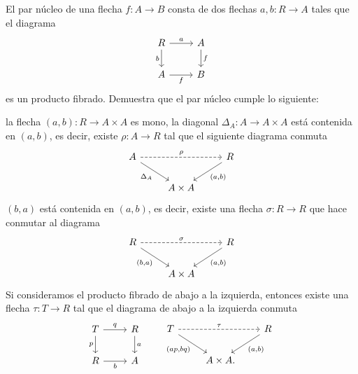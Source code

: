 \documentclass[article]{memoir}
\begin{document}
\begin{exercise}
  El par núcleo de una flecha \(f\colon A\to B\) consta de dos flechas \(a,b\colon R\to A\) tales que el diagrama
  \[
    \begin{tikzcd}[ampersand replacement=\&]
      R\ar{r}{a}\ar{d}[swap]{b} \& A\ar{d}{f}\\
      A\ar{r}[swap]{f} \& B
    \end{tikzcd}
  \]
  es un producto fibrado. Demuestra que el par núcleo cumple lo siguiente:
  \begin{tasks}
    \task la flecha \((a,b)\colon R\to A\times A\) es mono,
    \task la diagonal \(\Delta_A\colon A\to A\times A\) está contenida en \((a,b)\), es decir, existe \(\rho\colon A\to R\) tal que el siguiente diagrama conmuta
    \[
      \begin{tikzcd}[ampersand replacement=\&]
        A\ar[dashed]{rr}{\rho}\ar{rd}[swap]{\Delta_A} \&\& R\ar{ld}{{(a,b)}}\\
        \& A\times A
      \end{tikzcd}
    \]
    \task \((b,a)\) está contenida en \((a,b)\), es decir, existe una flecha \(\sigma\colon R\to R\) que hace conmutar al diagrama
    \[
      \begin{tikzcd}[ampersand replacement=\&]
        R\ar[dashed]{rr}{\sigma}\ar{rd}[swap]{{(b,a)}} \&\& R\ar{ld}{{(a,b)}}\\
        \& A\times A
      \end{tikzcd}
    \]
    \task Si consideramos el producto fibrado de abajo a la izquierda, entonces existe una flecha \(\tau\colon T\to R\) tal que el diagrama de abajo a la izquierda conmuta
    \[
      \begin{tikzcd}[ampersand replacement=\&]
        T\ar{r}{q}\ar{d}[swap]{p} \& R\ar{d}{a}\\
        R\ar{r}[swap]{b} \& A
      \end{tikzcd}
      \qquad
      \begin{tikzcd}[ampersand replacement=\&]
        T\ar[dashed]{rr}{\tau}\ar{rd}[swap]{{(ap,bq)}} \&\& R\ar{ld}{{(a,b)}}\\
        \& A\times A\mathrlap{.}
      \end{tikzcd}
    \]
  \end{tasks}
\end{exercise}
\end{document}
